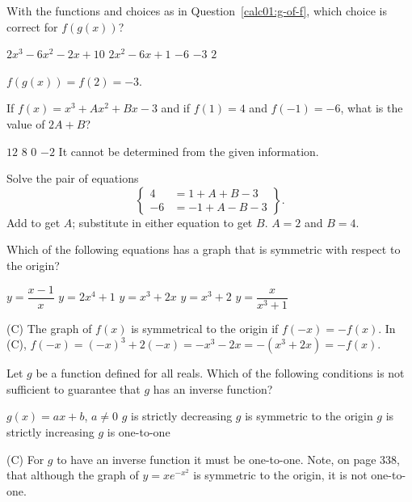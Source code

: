 \question
With the functions and choices as in Question~\ref{calc01:g-of-f}, which choice is correct for $f(g(x))$?
\begin{choices}
  \choice $2 x^{3}-6 x^{2}-2 x+10$
  \choice $2 x^{2}-6 x+1$
  \choice $-6$
  \CorrectChoice $-3$
  \choice $2$
\end{choices}
\begin{solution}
$f(g(x))=f(2)=-3$.
\end{solution}

\question
If $f(x)=x^{3}+A x^{2}+B x-3$ and if $f(1)=4$ and $f(-1)=-6$, what is the value of $2 A+B$?
\begin{choices}
  \choice $12$
  \CorrectChoice $8$
  \choice $0$
  \choice $-2$
  \choice It cannot be determined from the given information.
\end{choices}
\begin{solution}
Solve the pair of equations
\[
\left\{\begin{aligned}
4 & =1+A+B-3 \\
-6 & =-1+A-B-3
\end{aligned}\right\} .
\]
Add to get $A$; substitute in either equation to get $B$. $A=2$ and $B=4$.
\end{solution}

\question
Which of the following equations has a graph that is symmetric with respect to the origin?
\begin{choices}
  \choice $y=\dfrac{x-1}{x}$
  \choice $y=2 x^{4}+1$
  \CorrectChoice $y=x^{3}+2 x$
  \choice $y=x^{3}+2$
  \choice $y=\dfrac{x}{x^{3}+1}$
\end{choices}
\begin{solution}
(C) The graph of $f(x)$ is symmetrical to the origin if $f(-x)=-f(x)$. In (C), $f(-x)=(-x)^{3}+2(-x)=-x^{3}-2 x=-\left(x^{3}+2 x\right)=-f(x)$.
\end{solution}


\newpage



\question
Let $g$ be a function defined for all reals. Which of the following conditions is not sufficient to guarantee that $g$ has an inverse function?
\begin{choices}
  \choice $g(x)=a x+b$, $a \neq 0$
  \choice $g$ is strictly decreasing
  \CorrectChoice $g$ is symmetric to the origin
  \choice $g$ is strictly increasing
  \choice $g$ is one-to-one
\end{choices}
\begin{solution}
(C) For $g$ to have an inverse function it must be one-to-one. Note, on page 338, that although the graph of $y=x e^{-x^{2}}$ is symmetric to the origin, it is not one-to-one.
\end{solution}

